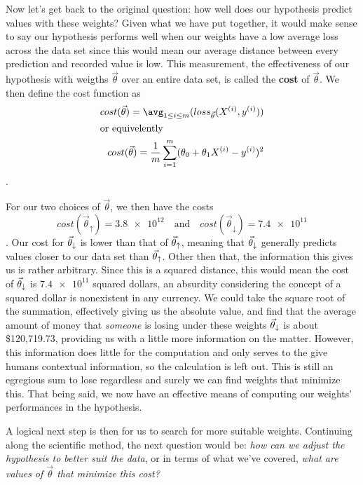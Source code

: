 Now let's get back to the original question: how well does our hypothesis
predict values with these weights? Given what we have put together, it would
make sense to say our hypothesis performs well when our weights have a low
average loss across the data set since this would mean our average distance
between every prediction and recorded value is low. This measurement, the
effectiveness of our hypothesis with weigths $\vec\theta$ over an entire data set, is
called the \textbf{cost} of $\vec\theta$. We then define the cost function as
\begin{subequations}
    \begin{align}
        cost(\vec\theta) = \avg_{1\leq i\leq m} (loss_{\vec\theta}(X^{(i)}, y^{(i)})) \\
    \intertext{or equivelently}
        cost(\vec\theta) = \frac{1}{m}\sum_{i=1}^m (\theta_0 + \theta_1X^{(i)} -
        y^{(i)})^2
    \end{align}
\end{subequations}
.

For our two choices of $\vec\theta$, we then have the costs
\begin{equation}\label{eq:tud cost results}
    cost(\vec\theta_{\uparrow})= \num{3.8e12} \quad \text{and} \quad
    cost(\vec\theta_{\downarrow}) = \num{7.4e11}
\end{equation}
. Our cost for $\vec\theta_{\downarrow}$ is lower than that of $\vec\theta_{\uparrow}$, meaning that $\vec\theta_{\downarrow}$ generally
predicts values closer to our data set than $\vec\theta_{\uparrow}$. Other then that, the
information this gives us is rather arbitrary. Since this is a squared distance,
this would mean the cost of $\vec\theta_{\downarrow}$ is $\num{7.4e11}$ squared dollars, an
absurdity considering the concept of a squared dollar is nonexistent in any
currency.  We could take the square root of the summation, effectively giving us the absolute value, and find that the average
amount of money that \emph{someone} is losing under these weights $\vec\theta_{\downarrow}$ is about
\$120,719.73, providing us with a little more information on the matter.
However, this information does little for the computation and only serves to the
give humans contextual information, so the calculation is left out. This is
still an egregious sum to lose regardless and surely we can find weights that minimize
this. That being said, we now have an effective means of computing our weights'
performances in the hypothesis.

A logical next step is then for us to search for more suitable weights. Continuing along
the scientific method, the next question would be: \emph{how can we adjust the
hypothesis to better suit the data}, or in terms of what we've covered,
\emph{what are values of $\vec\theta$ that minimize this cost?}


